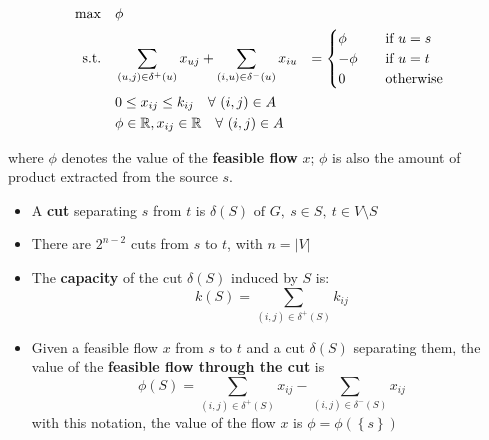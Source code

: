 \documentclass[english]{article}
\begin{document}
\begin{gather*}
  \begin{aligned}
    \max \quad        & \phi                                                                                                                                                                                       \\
    \text{s.t.} \quad & \displaystyle \sum_{\left( u, j \right) \in \delta^+(u)} x_{uj} + \displaystyle \sum_{\left( i, u \right) \in \delta^-(u)} x_{iu} & = \begin{cases}
                                                                                                                                                                \phi \quad   & \text{if } u = s \\
                                                                                                                                                                - \phi \quad & \text{if } u = t \\
                                                                                                                                                                0 \quad      & \text{otherwise}
                                                                                                                                                              \end{cases} \\
                      & 0 \leq x_{ij} \leq k_{ij} \quad \forall \, \left( i, j \right) \in A                                                                                                                       \\
                      & \phi \in \mathbb{R}, x_{ij} \in \mathbb{R} \quad \forall \, \left( i, j \right) \in A
  \end{aligned}
\end{gather*}

where \(\phi\) denotes the value of the \textbf{feasible flow} \(x\);
\(\phi\) is also the amount of product extracted from the source \(s\).

\begin{itemize}
  \item A \textbf{cut} separating \(s\) from \(t\) is \(\delta(S) \text{ of } G, \ s \in S, \ t \in V \setminus S\)
  \item There are \(2^{n-2}\) cuts from \(s\) to \(t\), with \(n = |V|\)
  \item The \textbf{capacity} of the cut \(\delta(S)\) induced by \(S\) is: \[ k(S) = \displaystyle \sum_{\left( i, j \right) \in \delta^+(S)} k_{ij} \]
  \item Given a feasible flow \(x\) from \(s\) to \(t\) and a cut \(\delta(S)\) separating them, the value of the \textbf{feasible flow through the cut} is \[\phi(S) = \displaystyle \sum_{\left( i, j \right) \in \delta^+(S)} x_{ij} - \sum_{\left( i, j \right) \in \delta^-(S)} x_{ij}\]
        with this notation, the value of the flow \(x\) is \(\phi = \phi\left( \left\{ s \right\} \right)\)
\end{itemize}
\end{document}
